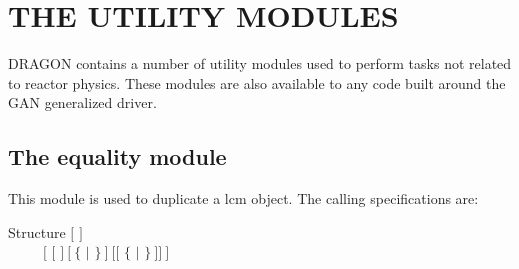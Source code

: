 \section{THE UTILITY MODULES}\label{sect:UtilityModuleInput}

DRAGON contains a number of utility modules used to perform tasks not
related to reactor physics. These modules are also available to any code built
around the GAN generalized driver.\cite{utilitaire}

\subsection{The equality module}\label{sect:EQUData}

This module is used to duplicate a {\sc lcm} object. The calling specifications
are:

\begin{DataStructure}{Structure }
 \moc{:=} $[$  $]$  \\
~~~~~$[$ \moc{::} $[$   $]~[~\{$  $|$ $\}~]~[[$  $\{$   $|$   $\}~]]~]$ \moc{;} \\
\end{DataStructure}

